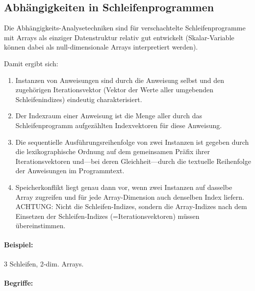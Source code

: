 \subsection{Abhängigkeiten in Schleifenprogrammen}

Die Abhängigkeits-Analysetechniken sind für verschachtelte
Schleifenprogramme mit Arrays als einziger Datenstruktur relativ gut
entwickelt (Skalar-Variable können dabei als null-dimensionale Arrays
interpretiert werden). 

\noindent
Damit ergibt sich:

\begin{enumerate}
\item Instanzen von Anweisungen sind durch die Anweisung selbst und den
  zugehörigen Iterationsvektor (Vektor der Werte aller umgebenden
  Schleifenindizes) eindeutig charakterisiert.
\item Der Indexraum einer Anweisung ist die Menge aller durch das
  Schleifenprogramm aufgezählten Indexvektoren für diese Anweisung.
\item Die sequentielle Ausführungsreihenfolge von zwei Instanzen ist
  gegeben durch die lexikographische Ordnung auf dem gemeinsamen Präfix
  ihrer Iterationsvektoren und---bei deren Gleichheit---durch die
  textuelle Reihenfolge der Anweisungen im Programmtext.
\item Speicherkonflikt liegt genau dann vor, wenn zwei Instanzen auf
  dasselbe Array zugreifen und für jede Array-Dimension auch denselben
  Index liefern. ACHTUNG: Nicht die Schleifen-Indizes, sondern die
  Array-Indizes nach dem Einsetzen der Schleifen-Indizes
  (=Iterationsvektoren) müssen übereinstimmen.
\end{enumerate}

\paragraph{Beispiel:} 3 Schleifen, 2-dim. Arrays.

\paragraph{Begriffe:}

